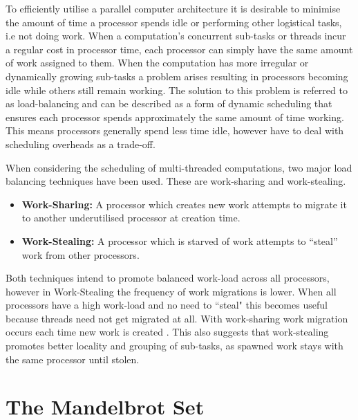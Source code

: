 To efficiently utilise a parallel computer architecture it is desirable to minimise
the amount of time a processor spends idle or performing other logistical tasks, i.e not doing work. 
When a computation's concurrent sub-tasks or \glspl{thread} incur a regular cost in processor
time, each processor can simply have the same amount of work assigned to them. When the computation has
more irregular or dynamically growing sub-tasks a problem arises resulting in 
processors becoming idle while others still remain working. The solution to this problem is referred to as
\gls{load-balancing} and can be described as a form of dynamic scheduling that ensures each processor 
spends approximately the same amount of time working. This means processors generally spend
less time idle, however have to deal with scheduling overheads as a trade-off.

When considering the scheduling of multi-threaded computations, two major load balancing techniques have been used.
These are \gls{work-sharing} and \gls{work-stealing}.

\begin{itemize}
\item \textbf{Work-Sharing:} A processor which creates new work attempts to migrate it to another underutilised processor at creation time. 
\item \textbf{Work-Stealing:} A processor which is starved of work attempts to ``steal'' work from other processors. 
\end{itemize}

Both techniques intend to promote balanced work-load across all processors, however in Work-Stealing
the frequency of work migrations is lower. When all processors have a 
high work-load and no need to ``steal" this becomes useful because threads need not get 
migrated at all. With \gls{work-sharing} work migration occurs each time new work is created \cite{blumleis}.
This also suggests that \gls{work-stealing} promotes better \gls{locality} and grouping of sub-tasks, as spawned work 
stays with the same processor until stolen.

\section{The Mandelbrot Set}


